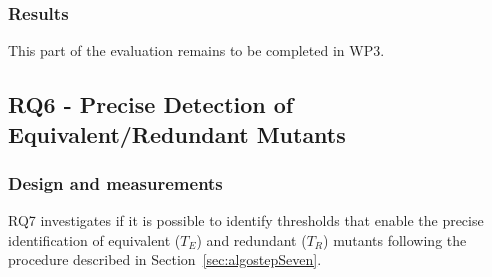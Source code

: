
%
%









\subsubsection*{Results}


This part of the evaluation remains to be completed in WP3.



\subsection{RQ6 - Precise Detection of Equivalent/Redundant Mutants}

\subsubsection*{Design and measurements}

RQ7 investigates if it is possible to identify thresholds that enable the precise identification of equivalent ($T_E$) and redundant ($T_R$) mutants following the procedure described in Section~\ref{sec:algostepSeven}.

